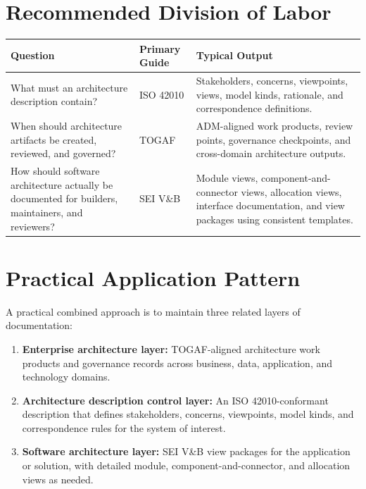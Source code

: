 \documentclass[11pt]{article}
\begin{document}
\section*{Recommended Division of Labor}
\begin{table}[h!]
\small
\centering
\begin{tabularx}{\textwidth}{>{\raggedright\arraybackslash}p{} >{\raggedright\arraybackslash}p{} X}
\toprule
\textbf{Question} & \textbf{Primary Guide} & \textbf{Typical Output} \\
\midrule
What must an architecture description contain? & ISO 42010 & Stakeholders, concerns, viewpoints, views, model kinds, rationale, and correspondence definitions.\cite{iso42010cm,iso42010ads} \\
\addlinespace
When should architecture artifacts be created, reviewed, and governed? & TOGAF & ADM-aligned work products, review points, governance checkpoints, and cross-domain architecture outputs.\cite{togafstd,togafadm} \\
\addlinespace
How should software architecture actually be documented for builders, maintainers, and reviewers? & SEI V\&B & Module views, component-and-connector views, allocation views, interface documentation, and view packages using consistent templates.\cite{sei_vb_factsheet,sei_vb_book} \\
\bottomrule
\end{tabularx}
\end{table}

\section*{Practical Application Pattern}
A practical combined approach is to maintain three related layers of documentation:
\begin{enumerate}[leftmargin=1.5em]
    \item \textbf{Enterprise architecture layer:} TOGAF-aligned architecture work products and governance records across business, data, application, and technology domains.\cite{togafstd,togafadm}
    \item \textbf{Architecture description control layer:} An ISO 42010-conformant description that defines stakeholders, concerns, viewpoints, model kinds, and correspondence rules for the system of interest.\cite{iso42010cm,iso42010ads}
    \item \textbf{Software architecture layer:} SEI V\&B view packages for the application or solution, with detailed module, component-and-connector, and allocation views as needed.\cite{sei_vb_factsheet,sei_vb_book}
\end{enumerate}
\end{document}
